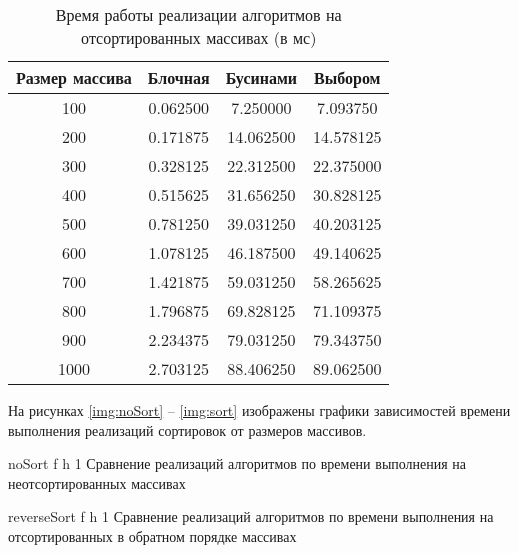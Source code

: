 \begin{table}[H]
	\begin{center}
		\begin{threeparttable}
			\captionsetup{justification=raggedright,singlelinecheck=off}
			\caption{Время работы реализации алгоритмов на отсортированных массивах (в мс)}
			\label{tbl:time_measurements_rand}
			\begin{tabular}{|c|c|c|c|}
				\hline
				Размер массива & Блочная & Бусинами & Выбором \\
				\hline
				100 & 0.062500 & 7.250000 & 7.093750 \\
				\hline
				200 & 0.171875 & 14.062500 & 14.578125 \\
				\hline
				300 & 0.328125 & 22.312500 & 22.375000 \\
				\hline
				400 & 0.515625 & 31.656250 & 30.828125 \\
				\hline
				500 & 0.781250 & 39.031250 & 40.203125 \\
				\hline
				600 & 1.078125 & 46.187500 & 49.140625 \\
				\hline
				700 & 1.421875 & 59.031250 & 58.265625 \\
				\hline
				800 & 1.796875 & 69.828125 & 71.109375 \\
				\hline
				900 & 2.234375 & 79.031250 & 79.343750 \\
				\hline
				1000 & 2.703125 & 88.406250 & 89.062500 \\
				\hline
			\end{tabular}
		\end{threeparttable}
	\end{center}
\end{table}




На рисунках \ref{img:noSort} -- \ref{img:sort} изображены графики зависимостей времени выполнения реализаций сортировок от размеров массивов.



{noSort} %
{f} %
{h} %
{1\textwidth} %
{Сравнение реализаций алгоритмов по времени выполнения на неотсортированных массивах} %


{reverseSort} %
{f} %
{h} %
{1\textwidth} %
{Сравнение реализаций алгоритмов по времени выполнения на отсортированных в обратном порядке массивах} %




